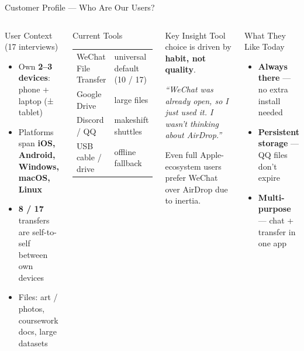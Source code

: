 \documentclass[xcolor=table,dvipsnames,svgnames,aspectratio=169]{beamer}
\begin{document}
\begin{frame}[shrink=16, t]{Customer Profile --- Who Are Our Users?}
  \begin{columns}[T]
    \begin{block}{User Context (17 interviews)}
      \begin{itemize}
        \item Own \textbf{2--3 devices}: phone + laptop (± tablet)
        \item Platforms span \textbf{iOS, Android, Windows, macOS, Linux}
        \item \textbf{8 / 17} transfers are self-to-self between own devices
        \item Files: art / photos, coursework docs, large datasets
      \end{itemize}
    \end{block}
    \vspace{0.1em}
    \begin{block}{Current Tools}
      \small
      \begin{tabular}{@{}ll@{}}
        WeChat File Transfer  & universal default (10 / 17) \\
        Google Drive          & large files                 \\
        Discord / QQ          & makeshift shuttles          \\
        USB cable / drive     & offline fallback            \\
      \end{tabular}
    \end{block}
    \begin{alertblock}{Key Insight}
      Tool choice is driven by \textbf{habit, not quality}.
      \vspace{0.4em}
 
      \small\itshape
      ``WeChat was already open, so I just used it.
       I wasn't thinking about AirDrop.''
      \vspace{0.4em}
 
      \normalfont\small
      Even full Apple-ecosystem users prefer WeChat
      over AirDrop due to inertia.
    \end{alertblock}
    \vspace{0.5em}
    \begin{block}{What They Like Today}
      \small
      \begin{itemize}
        \item \textbf{Always there} --- no extra install needed
        \item \textbf{Persistent storage} --- QQ files don't expire
        \item \textbf{Multi-purpose} --- chat + transfer in one app
      \end{itemize}
    \end{block}
  \end{columns}
\end{frame}
 
\end{document}
